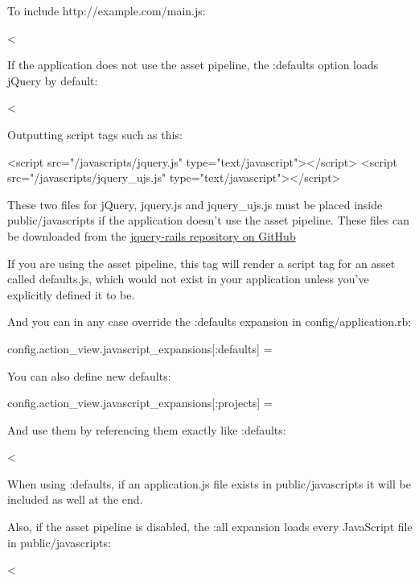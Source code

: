 \documentclass[10pt]{book}
\newenvironment{code}{%
  \scriptsize
    \verbatim
}{%
    \endverbatim
    \newline
}
\begin{document}
To include http://example.com/main.js:
\begin{code}
<%
\end{code}

If the application does not use the asset pipeline, the :defaults option loads jQuery by default:
\begin{code}
<%
\end{code}

Outputting script tags such as this:
\begin{code}
<script src="/javascripts/jquery.js" type="text/javascript"></script>
<script src="/javascripts/jquery_ujs.js" type="text/javascript"></script>
\end{code}

These two files for jQuery, jquery.js and jquery\_ujs.js must be placed inside public/javascripts if the application doesn’t use the asset pipeline. These files can be downloaded from the \href{https://github.com/indirect/jquery-rails/tree/master/vendor/assets/javascripts}{jquery-rails repository on GitHub}

If you are using the asset pipeline, this tag will render a script tag for an asset called defaults.js, which would not exist in your application unless you’ve explicitly defined it to be.

And you can in any case override the :defaults expansion in config/application.rb:
\begin{code}
config.action_view.javascript_expansions[:defaults] = %
\end{code}

You can also define new defaults:
\begin{code}
config.action_view.javascript_expansions[:projects] 
  = %
\end{code}

And use them by referencing them exactly like :defaults:
\begin{code}
<%
\end{code}

When using :defaults, if an application.js file exists in public/javascripts it will be included as well at the end.

Also, if the asset pipeline is disabled, the :all expansion loads every JavaScript file in public/javascripts:
\begin{code}
<%
\end{code}
\end{document}
